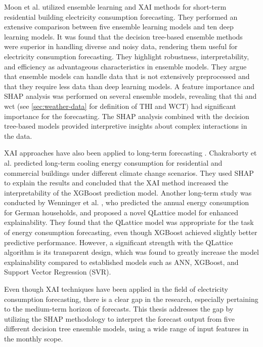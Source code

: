 Moon et al. \cite{moon_advancing_2024} utilized ensemble learning and XAI methods for short-term residential building electricity consumption forecasting. They performed an extensive comparison between five ensemble learning models and ten deep learning models. It was found that the decision tree-based ensemble methods were superior in handling diverse and noisy data, rendering them useful for electricity consumption forecasting. They highlight robustness, interpretability, and efficiency as advantageous characteristics in ensemble models. They argue that ensemble models can handle data that is not extensively preprocessed and that they require less data than deep learning models. A feature importance and SHAP analysis was performed on several ensemble models, revealing that \ac{thi} and \ac{wct} (see \autoref{sec:weather-data} for definition of THI and WCT) had significant importance for the forecasting. The SHAP analysis combined with the decision tree-based models provided interpretive insights about complex interactions in the data.

XAI approaches have also been applied to long-term forecasting \cite{machlev_explainable_2022}. Chakraborty et al.
\cite{chakraborty_scenario-based_2021} predicted long-term cooling energy consumption for residential and commercial buildings under different climate change scenarios. They used SHAP to explain the results and concluded that the XAI method increased the interpretability of the XGBoost prediction model. Another long-term study was conducted by Wenninger et al. \cite{wenninger_explainable_2022}, who predicted the annual energy consumption for German households, and proposed a novel QLattice model for enhanced explainability. They found that the QLattice model was appropriate for the task of energy consumption forecasting, even though XGBoost achieved slightly better predictive performance. However, a significant strength with the QLattice algorithm is its transparent design, which was found to greatly increase the model explainability compared to established models such as ANN, XGBoost, and Support Vector Regression (SVR).

Even though XAI techniques have been applied in the field of electricity consumption forecasting, there is a clear gap in the research, especially pertaining to the medium-term horizon of forecasts. This thesis addresses the gap by utilizing the SHAP methodology to interpret the forecast output from five different decision tree ensemble models, using a wide range of input features in the monthly scope.

